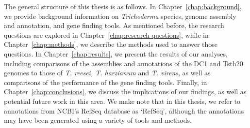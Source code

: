 The general structure of this thesis is as follows. In
Chapter~\ref{chap:background}, we provide background information
on \textit{Trichoderma} species, genome assembly and annotation, and
gene finding tools. As mentioned before, the research questions are
explored in Chapter~\ref{chap:research-questions}, while in
Chapter~\ref{chap:methods}, we describe the methods used to answer
those questions. In Chapter~\ref{chap:results}, we present the results
of our analyses, including comparisons of the assemblies and
annotations of the DC1 and Tsth20 genomes to those
of \textit{T. reesei, T. harzianum} and \textit{T. virens}, as well as
comparisons of the performance of the gene finding tools. Finally, in
Chapter~\ref{chap:conclusions}, we discuss the implications of our
findings, as well as potential future work in this area. We make note
that in this thesis, we refer to annotations from NCBI's RefSeq
database as `RefSeq', although the annotations may have been generated
using a variety of tools and methods.
